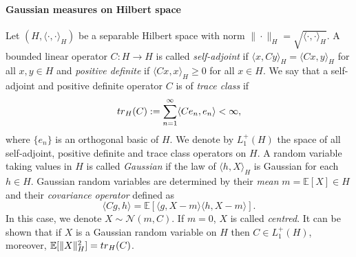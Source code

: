 \documentclass[10pt]{article} %
\theoremstyle{plain}
\theoremstyle{definition}
\theoremstyle{remark}
\newcommand{\tr}{{\rm tr}}
\begin{document}
\paragraph{Gaussian measures on Hilbert space}
Let $(H,  \langle \cdot, \cdot \rangle_H)$ be a separable Hilbert space with norm $\|\cdot\|_H = \sqrt{ \langle \cdot, \cdot \rangle_H}$. 
A bounded linear operator $C: H \to H$ is called \emph{self-adjoint} if $\langle x, C y \rangle_H = \langle C x, y \rangle_H $ for all $x,y \in H$ and \emph{positive definite} if $\langle C x, x \rangle_H \ge 0 $ for all $x\in H$. We say that a self-adjoint and positive definite operator $C$ is of \emph{trace class} if  
\begin{equation*}
    \tr_H(C):= \sum_{n=1}^\infty \langle Ce_n, e_n \rangle < \infty,
\end{equation*}
where $\{e_n\}$ is an orthogonal basic of $H$. We denote by $L_1^+(H)$ the space of all self-adjoint, positive definite and trace class operators on $H$.
A random variable taking values in $H$ is called \emph{Gaussian} if the law of $\langle h, X \rangle_H $ is Gaussian for each $h\in H$. Gaussian random variables are determined by their \emph{mean} $m = \mathbb E[X] \in H$ and their \emph{covariance operator} defined as
\begin{equation*}
    \langle C g, h \rangle = \mathbb E \left[\langle g, X - m \rangle\langle h, X - m \rangle\right].
\end{equation*}
In this case, we denote $X \sim \mathcal{N}(m, C)$. If $m=0$, $X$ is called \emph{centred}. It can be shown that if $X$ is a Gaussian random variable on $H$ then $C \in L_1^+(H)$, moreover, $\mathbb E[\|X\|_H^2] = \tr_H(C)$.
\end{document}
